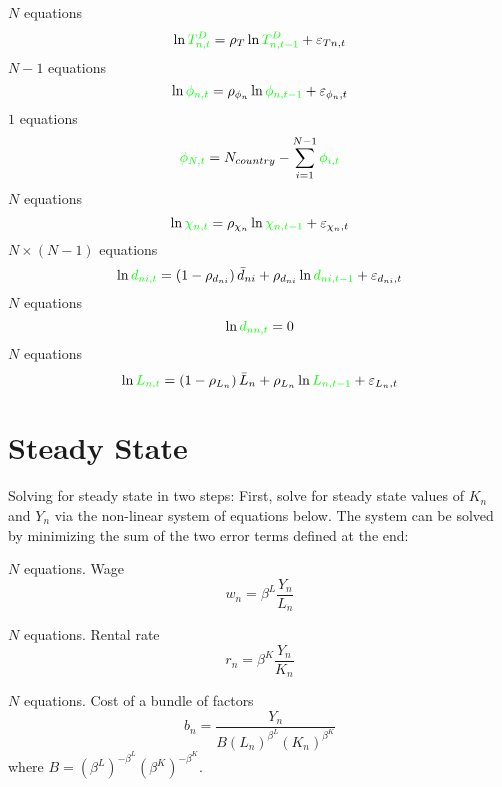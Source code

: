 \documentclass[11pt]{article}
\newcommand{\st}[1]{{\color{green}{#1}}}
\begin{document}
\noindent $N$ equations
\begin{equation}
\ln \st{T^D_{n,t}} = \rho_T \ln  \st{T^D_{n,t-1}} + \varepsilon_{Tn,t}    
\end{equation}
\noindent $N-1$ equations
\begin{equation}
\ln \st{\phi_{n,t}} = \rho_{\phi_n} \ln  \st{\phi_{n,t-1}} + \varepsilon_{\phi_n,t}  
\end{equation}
\noindent $1$ equations
\begin{equation}
\st{\phi_{N,t}} = N_{country} - \sum_{i=1}^{N-1} \st{\phi_{i,t}}
\end{equation}
\noindent $N$ equations
\begin{equation}
\ln \st{\chi_{n,t}} = \rho_{\chi_n} \ln  \st{\chi_{n,t-1}} + \varepsilon_{\chi_n,t}    
\end{equation}
\noindent $N \times (N-1)$ equations
\begin{equation}
\ln \st{d_{ni,t}} = \left(1 - \rho_{d_{ni}} \right) \bar{d}_{ni} + \rho_{d_{ni}} \ln  \st{d_{ni,t-1}} + \varepsilon_{d_{ni},t}    
\end{equation}
\noindent $N$ equations
\begin{equation}
\ln \st{d_{nn,t}} = 0  
\end{equation}
\noindent $N$ equations
\begin{equation}
\ln \st{L_{n,t}} = \left(1 - \rho_{L_{n}} \right) \bar{L}_{n} + \rho_{L_{n}} \ln  \st{L_{n,t-1}} + \varepsilon_{L_{n},t}    
\end{equation}


\section{Steady State}

Solving for steady state in two steps: First, solve for steady state values of $K_n$ and $Y_n$ via the non-linear system of equations below. The system can be solved by minimizing the sum of the two error terms defined at the end:

\noindent $N$ equations. Wage
\begin{equation}
w_{n} = \beta^L \frac{Y_{n}}{L_{n}}
\end{equation}

\noindent $N$ equations. Rental rate
\begin{equation}
 r_{n} = \beta^K \frac{Y_{n}}{K_{n}}
\end{equation}

\noindent $N$ equations. Cost of a bundle of factors
\begin{equation}
b_{n}=\frac{Y_{n}}{B\left(L_{n}\right)^{\beta^{L}}\left(K_{n}\right)^{\beta^{K}}}
\end{equation}
where $B=\left(\beta^{L}\right)^{-\beta^{L}}\left(\beta^{K}\right)^{-\beta^{K}}$.
\end{document}
